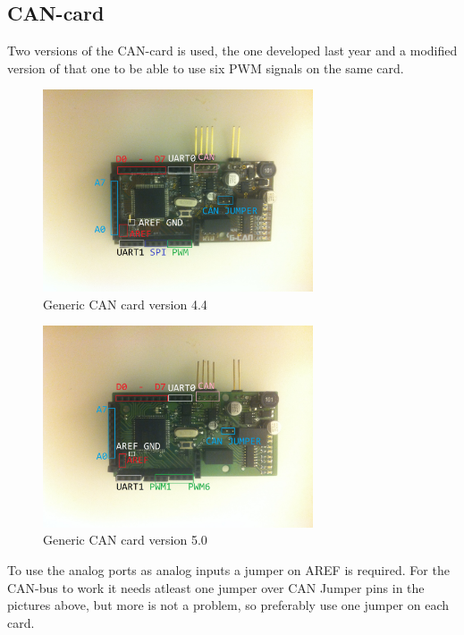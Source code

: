 \subsection{CAN-card}	%
\noindent Two versions of the CAN-card is used, the one developed last year and a modified version of that one to be able to use six PWM signals on the same card. 

\begin{figure}[!ht]
	\begin{center}
		\includegraphics[width=80mm]{./Images/Software/gcan_v4_4.JPG}
		\caption{Generic CAN card version 4.4}
		\label{YourLabel}
	\end{center}
\end{figure}

\begin{figure}[!ht]
	\begin{center}
		\includegraphics[width=80mm]{./Images/Software/gcan_v5_0.JPG}
		\caption{Generic CAN card version 5.0}
		\label{YourLabel}
	\end{center}
\end{figure}

To use the analog ports as analog inputs a jumper on AREF is required. For the CAN-bus to work it needs atleast one jumper over CAN Jumper pins in the pictures above, but more is not a problem, so preferably use one jumper on each card.

